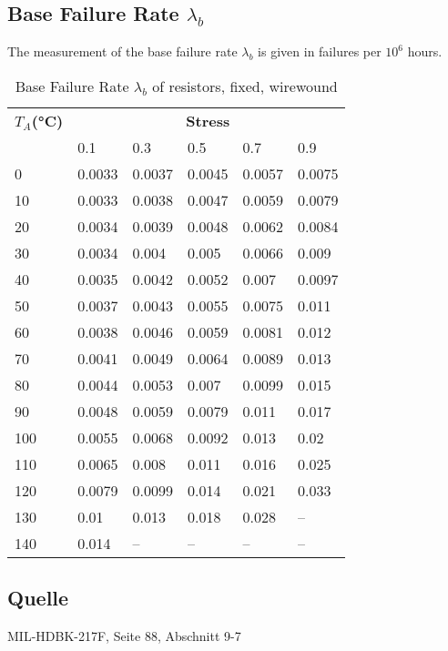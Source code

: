 \subsection{Base Failure Rate $\lambda_b$}
The measurement of the base failure rate $\lambda_b$ is given in failures per $10^6$ hours.
\begin{table}[ht]
{\centering

\begin{tabular}{|p{1cm}|*{5}{p{1.1cm}|}}
    \hline
    \textbf{$T_A$(°C)} & \multicolumn{5}{c|}{\textbf{Stress}} \\
    & 0.1 & 0.3 & 0.5 & 0.7 & 0.9 \\
    \hline
    0 & 0.0033 & 0.0037 & 0.0045 & 0.0057 & 0.0075 \\
    \hline
    10 & 0.0033 & 0.0038 & 0.0047 & 0.0059 & 0.0079 \\
    \hline
    20 & 0.0034 & 0.0039 & 0.0048 & 0.0062 & 0.0084 \\
    \hline
    30 & 0.0034 & 0.004 & 0.005 & 0.0066 & 0.009 \\
    \hline
    40 & 0.0035 & 0.0042 & 0.0052 & 0.007 & 0.0097 \\
    \hline
    50 & 0.0037 & 0.0043 & 0.0055 & 0.0075 & 0.011 \\
    \hline
    60 & 0.0038 & 0.0046 & 0.0059 & 0.0081 & 0.012 \\
    \hline
    70 & 0.0041 & 0.0049 & 0.0064 & 0.0089 & 0.013 \\
    \hline
    80 & 0.0044 & 0.0053 & 0.007 & 0.0099 & 0.015 \\
    \hline
    90 & 0.0048 & 0.0059 & 0.0079 & 0.011 & 0.017 \\
    \hline
    100 & 0.0055 & 0.0068 & 0.0092 & 0.013 & 0.02 \\
    \hline
    110 & 0.0065 & 0.008 & 0.011 & 0.016 & 0.025 \\
    \hline
    120 & 0.0079 & 0.0099 & 0.014 & 0.021 & 0.033 \\
    \hline
    130 & 0.01 & 0.013 & 0.018 & 0.028 & -- \\
    \hline
    140 & 0.014 & -- & -- & -- & -- \\
    \hline
\end{tabular}
\caption{Base Failure Rate $\lambda_b$ of resistors, fixed, wirewound}
\label{tab:bfr_resistors_fixed_wirewound}
\par}
\subsection*{Quelle}
MIL-HDBK-217F, Seite 88, Abschnitt 9-7
\end{table}